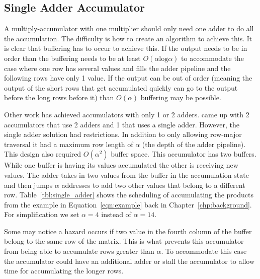 \subsection{Single Adder Accumulator}
A multiply-accumulator with one multiplier should only need one adder to do all the accumulation. The difficulty is how to create an algorithm to achieve this. It is clear that buffering has to occur to achieve this. If the output needs to be in order than the buffering needs to be at least $O(\alpha\textrm{log}\alpha)$ to accommodate the case where one row has several values and fills the adder pipeline and the following rows have only 1 value. If the output can be out of order (meaning the output of the short rows that get accumulated quickly can go to the output before the long rows before it) than $O(\alpha)$ buffering may be possible.

Other work has achieved accumulators with only 1 or 2 adders. \cite{prelim:zhuo} came up with 2 accumulators that use 2 adders and 1 that uses a single adder. However, the single adder solution had restrictions. In addition to only allowing row-major traversal it had a maximum row length of $\alpha$ (the depth of the adder pipeline). This design also required $O(\alpha^2)$ buffer space. This accumulator has two buffers. While one buffer is having its values accumulated the other is receiving new values. The adder takes in two values from the buffer in the accumulation state and then jumps $\alpha$ addresses to add two other values that belong to a different row. Table~\ref{tbl:single_adder} shows the scheduling of accumulating the products from the example in Equation~\ref{eqn:example} back in Chapter~\ref{chp:background}. For simplification we set $\alpha = 4$ instead of $\alpha = 14$.

Some may notice a hazard occurs if two value in the fourth column of the buffer belong to the same row of the matrix. This is what prevents this accumulator from being able to accumulate rows greater than $\alpha$. To accommodate this case the accumulator could have an additional adder or stall the accumulator to allow time for accumulating the longer rows.

